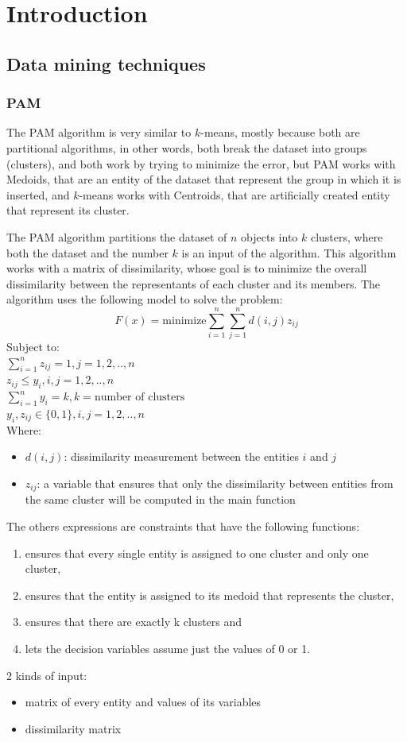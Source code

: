 \section{Introduction}
\subsection{Data mining techniques}
\subsubsection{PAM}
The PAM algorithm is very similar to \(k\)-means, mostly because both are partitional algorithms, in other words, both break the dataset into groups (clusters), and both work by trying to minimize the error, but PAM works with Medoids, that are an entity of the dataset that represent the group in which it is inserted, and \(k\)-means works with Centroids, that are artificially created entity that represent its cluster.

The PAM algorithm partitions the dataset of \(n\) objects into \(k\) clusters, where both the dataset and the number \(k\) is an input of the algorithm. This algorithm works with a matrix of dissimilarity, whose goal is to minimize the overall dissimilarity between the representants of each cluster and its members. The algorithm uses the following model to solve the problem:
\[F(x) = \text{minimize} \sum_{i=1}^{n} \sum_{j=1}^{n} d(i,j) z_{ij}\]
Subject to:\\
\(\sum_{i=1}^n z_{ij} = 1, j=1,2,..,n\)\\
\(z_{ij} \leq y_{i}, i,j = 1,2,..,n\)\\
\(\sum_{i=1}^n y_{i} = k, k = \text{number of clusters}\)\\
\(y_{i}, z_{ij} \in \{0,1\} , i,j = 1,2,..,n\)\\
Where:
\begin{itemize}
    \item \(d(i,j)\): dissimilarity measurement between the entities \(i\) and \(j\)
    \item \(z_{ij}\): a variable that ensures that only the dissimilarity between entities from the same cluster will be computed in the main function
\end{itemize}
The others expressions are constraints that have the following functions: 
\begin{enumerate}
    \item ensures that every single entity is assigned to one cluster and only one cluster, 
    \item ensures that the entity is assigned to its medoid that represents the cluster, 
    \item ensures that there are exactly k clusters and 
    \item lets the decision variables assume just the values of 0 or 1. 
\end{enumerate}
2 kinds of input:
\begin{itemize}
    \item matrix of every entity and values of its variables
    \item dissimilarity matrix
\end{itemize}
